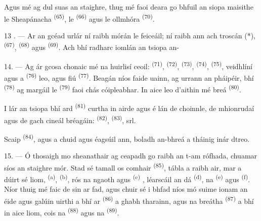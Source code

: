 Agus mé ag dul suas an staighre, thug mé faoi deara go bhfuil an siopa maisithe le
 Sheapánacha \textsuperscript{(65)}, le 
\textsuperscript{(66)} agus le  ollmhóra \textsuperscript{(70)}.

13 . --- Ar an gcéad urlár ní raibh mórán le feiceáil; ní raibh ann ach troscán (*),
 \textsuperscript{(67)}, 
\textsuperscript{(68)} agus  \textsuperscript{(69)}. Ach bhí
radharc iomlán an tsiopa an-

14. --- Ag ár gcosa chonaic mé na huirlisí ceoil: 
\textsuperscript{(71)},  \textsuperscript{(72)},
 \textsuperscript{(73)}, 
\textsuperscript{(74)},  \textsuperscript{(75)}, veidhlíní agus
a  \textsuperscript{(76)} leo, agus fiú 
\textsuperscript{(77)}. Beagán níos faide uainn, ag urrann an pháipéir, bhí
 \textsuperscript{(78)} ag margáil le 
\textsuperscript{(79)} faoi chás cóipleabhar. In aice leo d'aithin mé
 breá \textsuperscript{(80)}.

I lár an tsiopa bhí  ard \textsuperscript{(81)} curtha in airde
agus é lán de choinnle, de mhionrudaí agus de gach cineál bréagáin:  \textsuperscript{(82)},  \textsuperscript{(83)}, srl.

Scaip  \textsuperscript{(84)}, agus a chuid
 agus  éagsúil ann, boladh an-bhreá a tháinig
inár dtreo.

\VUsaut{3.4mm}
\VUsaut{2.8mm}

15. --- Ó thosaigh mo sheanathair ag ceapadh go raibh an t-am rófhada, chuamar síos
an staighre mór. Stad sé tamall os comhair 
\textsuperscript{(85)}, tábla a raibh air, mar a dúirt sé liom, 
\textsuperscript{(a)},  \textsuperscript{(b)},
rós na ngaoth agus  \textsuperscript{(c)} , léarscáil an dá
 \textsuperscript{(d)}, na 
\textsuperscript{(e)} agus  \textsuperscript{(f)}. Níor thuig mé
faic de sin ar fad, agus chuir sé i bhfad níos mó suime ionam an éide agus galúin uirthi a
bhí ar  \textsuperscript{(86)} a ghabh tharainn, agus
na  breátha \textsuperscript{(87)} a bhí in aice liom, cois na
 \textsuperscript{(88)} agus na 
\textsuperscript{(89)}.

